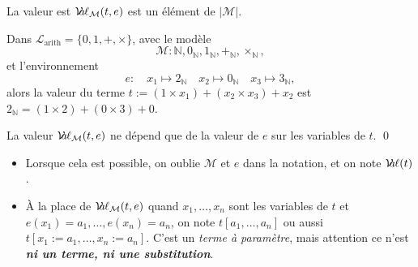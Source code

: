 \documentclass[./main]{subfiles}
\begin{document}
  \begin{rmk}
    La valeur est $\mathcal{V}\hspace{-3.5pt}a\hspace{-0.5pt}\ell_{\mathcal{M}}(t, e)$ est un élément de $|\mathcal{M}|$.
  \end{rmk}

  \begin{exm}
    Dans $\mathcal{L}_\mathrm{arith} = \{0, 1, +, \times\}$, avec le modèle \[
    \mathcal{M} : \mathds{N}, 0_\mathds{N}, 1_\mathds{N}, +_\mathds{N}, \times_\mathds{N}
    ,\] et l'environnement \[
    e : \quad x_1 \mapsto 2_\mathds{N} \quad x_2 \mapsto 0_\mathds{N} \quad x_3 \mapsto 3_\mathds{N}
    ,\] 
    alors la valeur du terme $t := (1 \times x_1) + (x_2 \times x_3) + x_2$ est $2_\mathds{N} = (1 \times 2) + (0 \times 3) + 0 $.
  \end{exm}

  \begin{lem}
    La valeur $\mathcal{V}\hspace{-3.5pt}a\hspace{-0.5pt}\ell_{\mathcal{M}}(t, e)$ ne dépend que de la valeur de $e$ sur les variables de $t$.
    \qed
  \end{lem}

  \begin{nota}
    \begin{itemize}
      \item Lorsque cela est possible, on oublie $\mathcal{M}$ et $e$ dans la notation, et on note $\mathcal{V}\hspace{-3.5pt}a\hspace{-0.5pt}\ell(t)$.
      \item À la place de  $\mathcal{V}\hspace{-3.5pt}a\hspace{-0.5pt}\ell_{\mathcal{M}}(t,e)$  quand $x_1, \ldots, x_n$ sont les variables de $t$ et $e(x_1) = a_1, \ldots, e(x_n) = a_n$, on note $t[a_1, \ldots, a_n]$ ou aussi~$t[x_1 := a_1, \ldots, x_n := a_n]$.
        C'est un \textit{terme à paramètre}, mais attention ce n'est \textit{\textbf{ni un terme, ni une substitution}}.
    \end{itemize}
  \end{nota}
\end{document}
